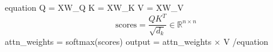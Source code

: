 {equation}
    Q = XW_Q
    K = XW_K
    V = XW_V
    \[
    \text{scores} = \frac{QK^T}{\sqrt{d_k}} \in \mathbb{R}^{n \times n}
    \]
    attn_weights = softmax(scores)
    output = attn_weights × V
{/equation}
